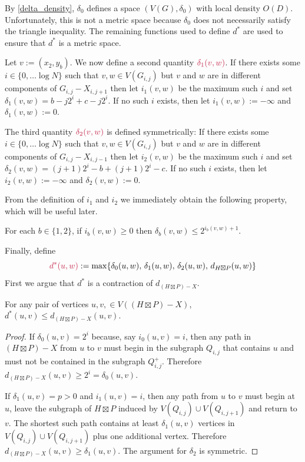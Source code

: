 \documentclass{patmorin}
\makeatletter
\renewcommand{\ge}{\geqslant}
\renewcommand{\le}{\leqslant}
\def\mathcolor#1#{\@mathcolor{#1}}
\def\@mathcolor#1#2#3{%
  \protect\leavevmode
  \begingroup
    \color#1{#2}#3%
  \endgroup
}
\newcommand{\mathdefin}[1]{\mathcolor{brightmaroon}{#1}}
\makeatother
\begin{document}
By \cref{delta_density}, $\delta_0$ defines a space $(V(G),\delta_0)$ with local density $O(D)$.  Unfortunately, this is not a metric space because $\delta_0$ does not necessarily satisfy the triangle inequality.  The remaining functions used to define $d^*$ are used to ensure that $d^*$ is a metric space.

Let $v:=(x_2,y_b)$.  We now define a second quantity $\mathdefin{\delta_1(v,w)}$.  If there exists some $i\in\{0,\ldots\log N\}$ such that $v,w\in V(G_{i,j})$ but $v$ and $w$ are in different components of $G_{i,j}-X_{i,j+1}$ then let $i_1(v,w)$ be the maximum such $i$ and set $\delta_1(v,w)=b-j2^i + c-j2^i$. If no such $i$ exists, then let $i_1(v,w):=-\infty$ and $\delta_1(v,w):=0$.

The third quantity $\mathdefin{\delta_2(v,w)}$ is defined symmetrically: If there exists some $i\in\{0,\ldots\log N\}$ such that $v,w\in V(G_{i,j})$ but $v$ and $w$ are in different components of $G_{i,j}-X_{i,j-1}$ then let $i_2(v,w)$ be the maximum such $i$ and set $\delta_2(v,w)=(j+1)2^i-b + (j+1)2^i-c$. If no such $i$ exists, then let $i_2(v,w):=-\infty$ and $\delta_2(v,w):=0$.

From the definition of $i_1$ and $i_2$ we immediately obtain the following property, which will be useful later.

\begin{obs}\label{i_bounds}
  For each $b\in\{1,2\}$, if
  $i_b(v,w)\ge 0$ then $\delta_b(v,w)\le 2^{i_b(v,w)+1}$.
\end{obs}

Finally, define
\[
  \mathdefin{d^*(u,w)} := \max\{\delta_0(u,w),\, \delta_1(u,w),\, \delta_2(u,w),\, d_{H\boxtimes P}(u,w) \}
\]
First we argue that $d^*$ is a contraction of $d_{(H\boxtimes P)-X}$.
\begin{lem}\label{d_star_contraction}
  For any pair of vertices $u,v,\in V((H\boxtimes P)-X)$, $d^*(u,v)\le d_{(H\boxtimes P)-X}(u,v)$.
\end{lem}

\begin{proof}
  If $\delta_0(u,v)=2^i$ because, say $i_0(u,v)=i$, then any path in $(H\boxtimes P)-X$ from $u$ to $v$ must begin in the subgraph $Q_{i,j}$ that contains $u$ and must not be contained in the subgraph $Q^+_{i,j}$.  Therefore $d_{(H\boxtimes P)-X}(u,v) \ge 2^i=\delta_0(u,v)$.

  If $\delta_1(u,v)=p>0$ and $i_1(u,v)=i$, then any path from $u$ to $v$ must begin at $u$, leave the subgraph of $H\boxtimes P$ induced by $V(Q_{i,j})\cup V(Q_{i,j+1})$ and return to $v$.  The shortest such path contains at least $\delta_1(u,v)$ vertices in $V(Q_{i,j})\cup V(Q_{i,j+1})$ plus one additional vertex.  Therefore $d_{(H\boxtimes P)-X}(u,v) \ge \delta_1(u,v)$.  The argument for $\delta_2$ is symmetric.
\end{proof}
\end{document}

